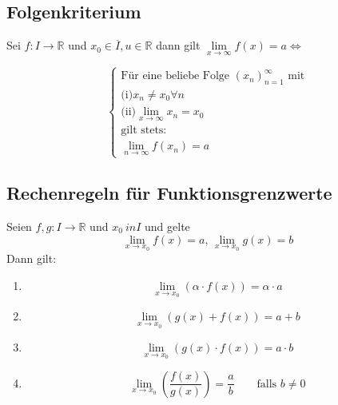 \documentclass[10pt]{article}
\newcommand{\R}{\mathbb{R}}
\begin{document}
    \subsection{Folgenkriterium}
    Sei $f: I \rightarrow \R$ und $x_0 \in \overline{I}, u \in \R$ dann gilt
    $\lim\limits_{x \rightarrow \infty} f(x) = a \Leftrightarrow$

    \begin{equation*}
        \begin{cases}
            \text{Für eine beliebe Folge } {(x_n)}_{n=1}^\infty \text{ mit}\\
            \text{(i)} x_n \neq x_0 \forall n\\
            \text{(ii)} \lim\limits_{x \rightarrow \infty} x_n = x_0\\
            \text{gilt stets:}\\
            \lim\limits_{n \rightarrow \infty} f(x_n) = a
        \end{cases}
    \end{equation*}

    \subsection{Rechenregeln für Funktionsgrenzwerte}
    Seien $f, g: I \rightarrow \R$ und $x_0 \ in I$ und gelte
    \begin{equation*}
        \lim_{x \rightarrow x_0} f(x) = a \text{, }
        \lim_{x \rightarrow x_0} g(x) = b
    \end{equation*}
    Dann gilt:
    \begin{enumerate}[label= (\alph*)]
        \item
            \begin{equation*}
                \lim_{x \rightarrow x_0} (\alpha \cdot f(x)) = \alpha \cdot a
            \end{equation*}
        \item
            \begin{equation*}
                \lim_{x \rightarrow x_0} (g(x) + f(x)) = a + b
            \end{equation*}
        \item
            \begin{equation*}
                \lim_{x \rightarrow x_0} (g(x) \cdot f(x)) = a \cdot b
            \end{equation*}
        \item
            \begin{equation*}
                \lim_{x \rightarrow x_0} \left(\frac{f(x)}{g(x)}\right) = \frac{a}{b}
                \qquad\text{falls } b \neq 0
            \end{equation*}
    \end{enumerate}
\end{document}
